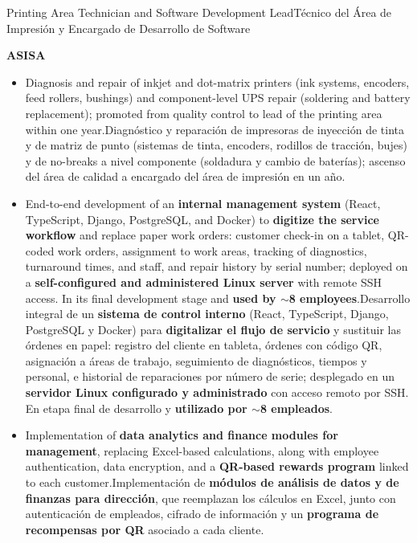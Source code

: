 \documentclass[10pt,a4paper,withhyper]{altacv}
\newcommand{\tr}[2]{\ifEN #2\else #1\fi}
\renewcommand{\cvevent}[4]{%
  \Needspace{6\baselineskip}%
  {\large\color{emphasis}#1\par}
  \smallskip\normalsize
  \ifstrequal{#2}{}{}{%
  \textbf{\color{accent}#2}\par
  \smallskip}%
  \ifstrequal{#3}{}{}{%
    {\small\makebox[0.5\linewidth][l]%
      {\BeginAccSupp{method=pdfstringdef,ActualText={\datename:}}\cvDateMarker\EndAccSupp{}~#3}%
    }}%
  \ifstrequal{#4}{}{}{%
    {\small\makebox[0.5\linewidth][l]%
      {\BeginAccSupp{method=pdfstringdef,ActualText={\locationname:}}\cvLocationMarker\EndAccSupp{}~#4}%
    }}\par
  \smallskip\normalsize
}
\begin{document}
\cvevent{\tr{Técnico del Área de Impresión y Encargado de Desarrollo de Software}{Printing Area Technician and Software Development Lead}}{ASISA}{2017 -- 2026}{}
\begin{itemize}
\item \tr{Diagnóstico y reparación de impresoras de inyección de tinta y de matriz de punto (sistemas de tinta, encoders, rodillos de tracción, bujes) y de no-breaks a nivel componente (soldadura y cambio de baterías); ascenso del área de calidad a encargado del área de impresión en un año.}{Diagnosis and repair of inkjet and dot-matrix printers (ink systems, encoders, feed rollers, bushings) and component-level UPS repair (soldering and battery replacement); promoted from quality control to lead of the printing area within one year.}
\item \tr{Desarrollo integral de un \textbf{sistema de control interno} (React, TypeScript, Django, PostgreSQL y Docker) para \textbf{digitalizar el flujo de servicio} y sustituir las órdenes en papel: registro del cliente en tableta, órdenes con código QR, asignación a áreas de trabajo, seguimiento de diagnósticos, tiempos y personal, e historial de reparaciones por número de serie; desplegado en un \textbf{servidor Linux configurado y administrado} con acceso remoto por SSH. En etapa final de desarrollo y \textbf{utilizado por $\sim$8 empleados}.}{End-to-end development of an \textbf{internal management system} (React, TypeScript, Django, PostgreSQL, and Docker) to \textbf{digitize the service workflow} and replace paper work orders: customer check-in on a tablet, QR-coded work orders, assignment to work areas, tracking of diagnostics, turnaround times, and staff, and repair history by serial number; deployed on a \textbf{self-configured and administered Linux server} with remote SSH access. In its final development stage and \textbf{used by $\sim$8 employees}.}
\item \tr{Implementación de \textbf{módulos de análisis de datos y de finanzas para dirección}, que reemplazan los cálculos en Excel, junto con autenticación de empleados, cifrado de información y un \textbf{programa de recompensas por QR} asociado a cada cliente.}{Implementation of \textbf{data analytics and finance modules for management}, replacing Excel-based calculations, along with employee authentication, data encryption, and a \textbf{QR-based rewards program} linked to each customer.}
\end{itemize}

\end{document}
